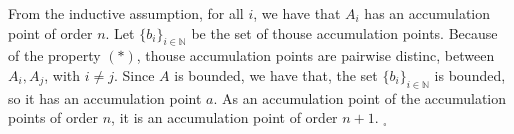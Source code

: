 From the inductive 
assumption, for all $i$, we have that $A_i$ has an accumulation point of order $n$. Let 
$\{b_i\}_{i\in\mathbb{N}}$ be the set of thouse accumulation points.
Because of the property $(\ast)$, thouse accumulation points are pairwise distinc, between 
$A_i, A_j$, with $i\neq j$. Since $A$ is bounded, we have that, the set $\{b_i\}_{i\in\mathbb{N}}$ 
is bounded, so it has an accumulation point $a$. As an accumulation point of the accumulation 
points of order $n$, it is an accumulation point of order $n+1$. $_\square$ 






